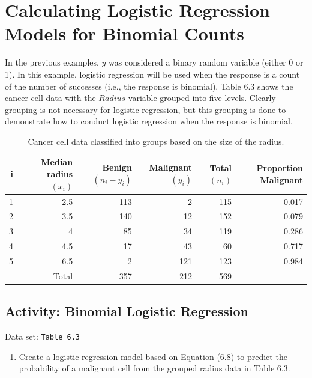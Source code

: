 \documentclass[
]{book}
\providecommand{\tightlist}{%
  \setlength{\itemsep}{0pt}\setlength{\parskip}{0pt}}
\begin{document}
\hypertarget{calculating-logistic-regression-models-for-binomial-counts}{%
\section{Calculating Logistic Regression Models for Binomial Counts}\label{calculating-logistic-regression-models-for-binomial-counts}}

In the previous examples, \(y\) was considered a binary random variable (either 0 or 1). In this example, logistic regression will be used when the response is a count of the number of successes (i.e., the response is binomial). Table 6.3 shows the cancer cell data with the \(Radius\) variable grouped into five levels. Clearly grouping is not necessary for logistic regression, but this grouping is done to demonstrate how to conduct logistic regression when the response is binomial.

\begin{table}[!h]
\centering
\caption{\label{tab:tab63}Cancer cell data classified into groups based on the size of the radius.}
\centering
\begin{tabular}[t]{rrrrrr}
\toprule
i & Median radius $(x_i)$ & Benign $(n_i - y_i)$ & Malignant $(y_i)$ & Total $(n_i)$ & Proportion Malignant\\
\midrule
1 & 2.5 & 113 & 2 & 115 & 0.017\\
2 & 3.5 & 140 & 12 & 152 & 0.079\\
3 & 4 & 85 & 34 & 119 & 0.286\\
4 & 4.5 & 17 & 43 & 60 & 0.717\\
5 & 6.5 & 2 & 121 & 123 & 0.984\\
\addlinespace
 & Total & 357 & 212 & 569 & \\
\bottomrule
\end{tabular}
\end{table}

\hypertarget{activity-binomial-logistic-regression}{%
\subsection*{Activity: Binomial Logistic Regression}\label{activity-binomial-logistic-regression}}

Data set: \texttt{Table\ 6.3}

\begin{enumerate}
\def\labelenumi{\arabic{enumi}.}
\setcounter{enumi}{25}
\tightlist
\item
  Create a logistic regression model based on Equation (6.8) to predict the probability of a malignant cell from the grouped radius data in Table 6.3.\\
\end{enumerate}
\end{document}
